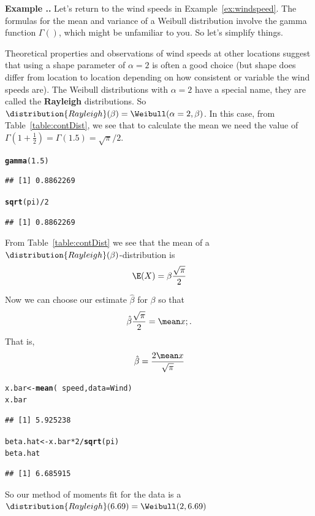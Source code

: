 \documentclass[twoside]{book}\usepackage[]{graphicx}\usepackage[]{xcolor}
\makeatletter
\newcommand{\hlnum}[1]{\textcolor[rgb]{0.686,0.059,0.569}{#1}}%
\newcommand{\hlopt}[1]{\textcolor[rgb]{0,0,0}{#1}}%
\newcommand{\hlstd}[1]{\textcolor[rgb]{0.345,0.345,0.345}{#1}}%
\newcommand{\hlkwb}[1]{\textcolor[rgb]{0.69,0.353,0.396}{#1}}%
\newcommand{\hlkwc}[1]{\textcolor[rgb]{0.333,0.667,0.333}{#1}}%
\newcommand{\hlkwd}[1]{\textcolor[rgb]{0.737,0.353,0.396}{\textbf{#1}}}%
\newenvironment{kframe}{%
 \def\at@end@of@kframe{}%
 \ifinner\ifhmode%
  \def\at@end@of@kframe{\end{minipage}}%
  \begin{minipage}{\columnwidth}%
 \fi\fi%
 \def\FrameCommand##1{\hskip\@totalleftmargin \hskip-\fboxsep
 \colorbox{shadecolor}{##1}\hskip-\fboxsep
     \hskip-\linewidth \hskip-\@totalleftmargin \hskip\columnwidth}%
 \MakeFramed {\advance\hsize-\width
   \@totalleftmargin\z@ \linewidth\hsize
   \@setminipage}}%
 {\par\unskip\endMakeFramed%
 \at@end@of@kframe}
\newenvironment{knitrout}{}{} %
\def\Rayleigh{\distribution{Rayleigh}}
\def\term#1{\textbf{#1}}
\newcounter{example}[section]
\newenvironment{example}%
{\refstepcounter{example}%
\textbf{Example \thesection.\arabic{example}. }}%
{}
\makeatother
\begin{document}
\begin{example}
	Let's return to the wind speeds in Example~\ref{ex:windspeed}.
	The formulas for the mean and variance of a Weibull distribution involve
	the gamma function $\Gamma()$, which might be unfamiliar to you.  So let's 
	simplify things.

	Theoretical properties and observations of wind speeds at other locations 
	suggest that using a shape parameter of $\alpha=2$ is often a good choice (but 
	shape does differ from location to location depending on how consistent or 
	variable the wind speeds are).
	The Weibull distributions with $\alpha=2$ have a special name, they are 
	called the \term{Rayleigh} distributions.  
	So $\Rayleigh(\beta) = \Weibull(\alpha=2, \beta)$.
	In this case, from Table~\ref{table:contDist}, we see that to calculate 
	the mean we need the value of $\Gamma(1 + \frac{1}{2}) = \Gamma(1.5) = \sqrt{\pi}/2$.
\begin{knitrout}
\color{fgcolor}\begin{kframe}
\begin{alltt}
\hlkwd{gamma}\hlstd{(}\hlnum{1.5}\hlstd{)}
\end{alltt}
\begin{verbatim}
## [1] 0.8862269
\end{verbatim}
\begin{alltt}
\hlkwd{sqrt}\hlstd{(pi)}\hlopt{/}\hlnum{2}
\end{alltt}
\begin{verbatim}
## [1] 0.8862269
\end{verbatim}
\end{kframe}
\end{knitrout}
	From Table~\ref{table:contDist} we see that the mean of a 
	$\Rayleigh(\beta)$-distribution is 
	\[
	\E(X) = \beta \frac{\sqrt{\pi}}{2}
	\]

	Now we can choose our estimate $\hat \beta$ for $\beta$ so that 
	\[
	\hat \beta \frac{\sqrt{\pi}}{2} = \mean x  ;.
	\]
	That is,
	\[
	\hat\beta = \frac{2 \mean x }{\sqrt{\pi}}
	\]
\begin{knitrout}
\color{fgcolor}\begin{kframe}
\begin{alltt}
\hlstd{x.bar} \hlkwb{<-} \hlkwd{mean}\hlstd{(}\hlopt{~}\hlstd{speed,} \hlkwc{data}\hlstd{=Wind)}
\hlstd{x.bar}
\end{alltt}
\begin{verbatim}
## [1] 5.925238
\end{verbatim}
\begin{alltt}
\hlstd{beta.hat} \hlkwb{<-} \hlstd{x.bar} \hlopt{*} \hlnum{2} \hlopt{/} \hlkwd{sqrt}\hlstd{(pi)}
\hlstd{beta.hat}
\end{alltt}
\begin{verbatim}
## [1] 6.685915
\end{verbatim}
\end{kframe}
\end{knitrout}
So our method of moments fit for the data is a 
$\Rayleigh(6.69) = \Weibull(2, 6.69)$


\end{example}
\end{document}
